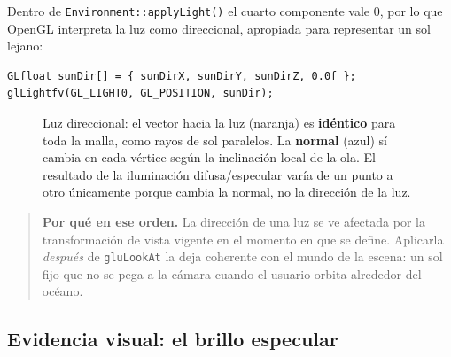 ﻿\documentclass[11pt]{article}
\begin{document}
Dentro de \texttt{Environment::applyLight()} el cuarto componente vale $0$,
por lo que OpenGL interpreta la luz como direccional, apropiada para representar
un sol lejano:

\begin{lstlisting}
GLfloat sunDir[] = { sunDirX, sunDirY, sunDirZ, 0.0f };
glLightfv(GL_LIGHT0, GL_POSITION, sunDir);
\end{lstlisting}

\begin{figure}[H]\centering
{}
\caption{Luz direccional: el vector hacia la luz (naranja) es \textbf{idéntico}
para toda la malla, como rayos de sol paralelos. La \textbf{normal} (azul) sí
cambia en cada vértice según la inclinación local de la ola. El resultado de
la iluminación difusa/especular varía de un punto a otro únicamente porque
cambia la normal, no la dirección de la luz.}
\end{figure}

\begin{quote}
\textbf{Por qué en ese orden.} La dirección de una luz se ve afectada por la
transformación de vista vigente en el momento en que se define. Aplicarla
\emph{después} de \texttt{gluLookAt} la deja coherente con el mundo de la escena:
un sol fijo que no se pega a la cámara cuando el usuario orbita alrededor del
océano.
\end{quote}

\subsection{Evidencia visual: el brillo especular}
\end{document}
